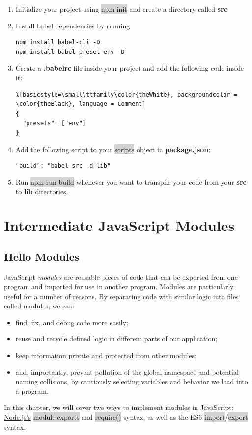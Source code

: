 \documentclass[11pt]{article}
\begin{document}
\begin{enumerate}[leftmargin = *]
\item Initialize your project using \colorbox{lightgray}{npm init} and create a directory called \textbf{src}
\item Install babel dependencies by running
\begin{lstlisting}[basicstyle=\small\ttfamily\color{theWhite}, backgroundcolor = \color{theBlack}, language = Comment]
npm install babel-cli -D
npm install babel-preset-env -D
\end{lstlisting}
\item Create a \textbf{.babelrc} file inside your project and add the following code inside it:
\begin{lstlisting}%[basicstyle=\small\ttfamily\color{theWhite}, backgroundcolor = \color{theBlack}, language = Comment]
{
  "presets": ["env"]
}
\end{lstlisting}
\item Add the following script to your \colorbox{lightgray}{scripts} object in \textbf{package.json}:
\begin{lstlisting}
"build": "babel src -d lib"
\end{lstlisting}
\item Run \colorbox{lightgray}{npm run build} whenever you want to transpile your code from your \textbf{src} to \textbf{lib} directories.
\end{enumerate}

\newpage
\section{Intermediate JavaScript Modules}
\subsection{Hello Modules}
JavaScript \textit{modules} are reusable pieces of code that can be exported from one program and imported for use in another program. Modules are particularly useful for a number of reasons. By separating code with similar logic into files called modules, we can:
\begin{itemize}[leftmargin = *]
\item find, fix, and debug code more easily;
\item reuse and recycle defined logic in different parts of our application;
\item keep information private and protected from other modules;
\item and, importantly, prevent pollution of the global namespace and potential naming collisions, by cautiously selecting variables and behavior we load into a program.
\end{itemize}
In this chapter, we will cover two ways to implement modules in JavaScript: \href{https://nodejs.org/en/about/}{Node.js’s} \colorbox{lightgray}{module.exports} and \colorbox{lightgray}{require()} syntax, as well as the ES6 \colorbox{lightgray}{import}/\colorbox{lightgray}{export} syntax.
\end{document}
